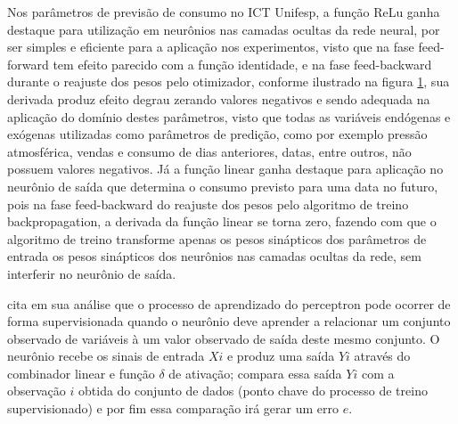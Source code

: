      Nos parâmetros de previsão de consumo no ICT Unifesp, a função ReLu ganha destaque para utilização em neurônios nas camadas ocultas da rede neural, por ser simples e eficiente para a aplicação nos experimentos, visto que na fase feed-forward tem efeito parecido com a função identidade, e na fase feed-backward durante o reajuste dos pesos pelo otimizador, conforme ilustrado na figura \ref{fig:ReLu}, sua derivada produz efeito degrau zerando valores negativos e sendo adequada na aplicação do domínio destes parâmetros, visto que todas as variáveis endógenas e exógenas utilizadas como parâmetros de predição, como por exemplo pressão atmosférica, vendas e consumo de dias anteriores, datas, entre outros, não possuem valores negativos. Já a função linear ganha destaque para aplicação no neurônio de saída que determina o consumo previsto para uma data no futuro, pois na fase feed-backward do reajuste dos pesos pelo algoritmo de treino backpropagation, a derivada da função linear se torna zero, fazendo com que o algoritmo de treino transforme apenas os pesos sinápticos dos parâmetros de entrada os pesos sinápticos dos neurônios nas camadas ocultas da rede, sem interferir no neurônio de saída.
     
      \begin{figure}[H]
     \label{fig:ReLu}
    \end{figure}
    			
    \cite{Almeida2013} cita em sua análise que o processo de aprendizado do perceptron pode ocorrer de forma supervisionada quando o neurônio deve aprender a relacionar um conjunto observado de variáveis à um valor observado de saída deste mesmo conjunto. O neurônio recebe os sinais de entrada $Xi$ e produz uma saída $Yi$ através do combinador linear e função $\delta$ de ativação; compara essa saída $Yi$ com a observação $i$ obtida do conjunto de dados (ponto chave do processo de treino supervisionado) e por fim essa comparação irá gerar um erro $e$.
                
